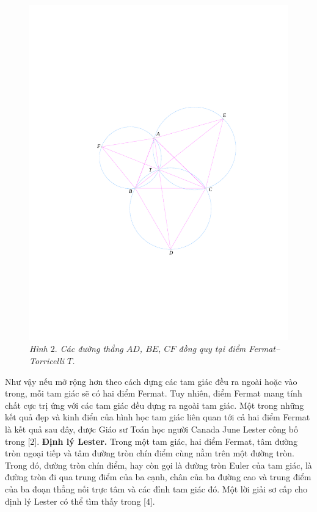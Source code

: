 \begin{multicols}{2}
	\begin{figure}[H]
		\vspace*{-5pt}
		\centering
		\captionsetup{labelformat= empty, justification=centering}
		\includegraphics[width= 0.9\linewidth]{figure8054}
		\caption{\small\textit{\color{cackithi}Hình $2.$ Các đường thẳng $AD$, $BE$, $CF$ đồng quy tại điểm Fermat--Torricelli $T$.}}
		\vspace*{-10pt}
	\end{figure}
	Như vậy nếu mở rộng hơn theo cách dựng các tam giác đều ra ngoài hoặc vào trong, mỗi tam giác sẽ có hai điểm Fermat. Tuy nhiên, điểm Fermat mang tính chất cực trị ứng với các tam giác đều dựng ra ngoài tam giác.
	\vskip 0.1cm
	Một trong những kết quả đẹp và kinh điển của hình học tam giác liên quan tới cả hai điểm Fermat là kết quả sau đây, được Giáo sư Toán học người Canada June Lester công bố trong [$2$].
	\vskip 0.1cm
	{\bf\color{cackithi}Định lý Lester.} Trong một tam giác, hai điểm Fermat, tâm đường tròn ngoại tiếp và tâm đường tròn chín điểm cùng nằm trên một đường tròn.
	\vskip 0.1cm
	Trong đó, đường tròn chín điểm, hay còn gọi là đường tròn Euler của tam giác, là đường tròn đi qua trung điểm của ba cạnh, chân của ba đường cao và trung điểm của ba đoạn thẳng nối trực tâm và các đỉnh tam giác đó. Một lời giải sơ cấp cho định lý Lester có thể tìm thấy trong [$4$].

\end{multicols}
